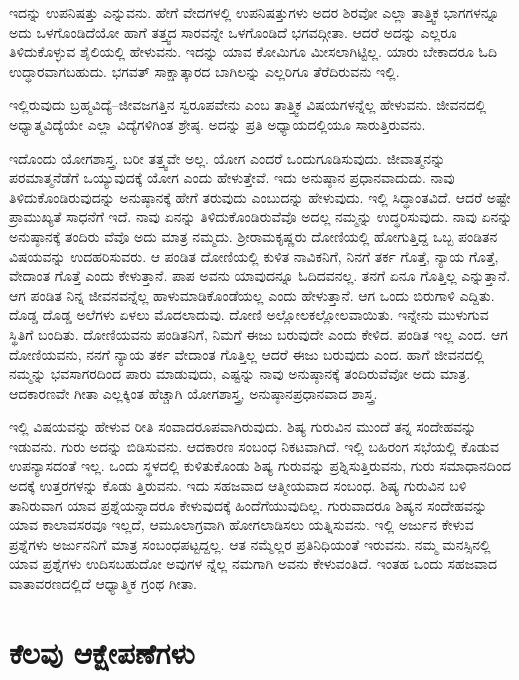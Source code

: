 ಇದನ್ನು ಉಪನಿಷತ್ತು ಎನ್ನುವನು. ಹೇಗೆ ವೇದಗಳಲ್ಲಿ ಉಪನಿಷತ್ತುಗಳು ಅದರ ಶಿರವೋ ಎಲ್ಲಾ ತಾತ್ತ್ವಿಕ ಭಾಗಗಳನ್ನೂ ಅದು ಒಳಗೊಂಡಿದೆಯೋ ಹಾಗೆ ತತ್ತ್ವದ ಸಾರವನ್ನೇ ಒಳಗೊಂಡಿದೆ ಭಗವದ್ಗೀತಾ. ಆದರೆ ಅದನ್ನು ಎಲ್ಲರೂ ತಿಳಿದುಕೊಳ್ಳುವ ಶೈಲಿಯಲ್ಲಿ ಹೇಳುವನು. ಇದನ್ನು ಯಾವ ಕೋಮಿಗೂ ಮೀಸಲಾಗಿಟ್ಟಿಲ್ಲ. ಯಾರು ಬೇಕಾದರೂ ಓದಿ ಉದ್ಧಾರವಾಗಬಹುದು. ಭಗವತ್ ಸಾಕ್ಷಾತ್ಕಾರದ ಬಾಗಿಲನ್ನು ಎಲ್ಲರಿಗೂ ತೆರೆದಿರುವನು ಇಲ್ಲಿ.

ಇಲ್ಲಿರುವುದು ಬ್ರಹ್ಮವಿದ್ಯೆ–ಜೀವಜಗತ್ತಿನ ಸ್ವರೂಪವೇನು ಎಂಬ ತಾತ್ತ್ವಿಕ ವಿಷಯಗಳನ್ನೆಲ್ಲ ಹೇಳುವನು. ಜೀವನದಲ್ಲಿ ಅಧ್ಯಾತ್ಮವಿದ್ಯೆಯೇ ಎಲ್ಲಾ ವಿದ್ಯೆಗಳಿಗಿಂತ ಶ್ರೇಷ್ಠ. ಅದನ್ನು ಪ್ರತಿ ಅಧ್ಯಾಯದಲ್ಲಿಯೂ ಸಾರುತ್ತಿರುವನು.

ಇದೊಂದು ಯೋಗಶಾಸ್ತ್ರ. ಬರೀ ತತ್ತ್ವವೇ ಅಲ್ಲ. ಯೋಗ ಎಂದರೆ ಒಂದುಗೂಡಿಸುವುದು. ಜೀವಾತ್ಮನನ್ನು ಪರಮಾತ್ಮನೆಡೆಗೆ ಒಯ್ಯುವುದಕ್ಕೆ ಯೋಗ ಎಂದು ಹೇಳುತ್ತೇವೆ. ಇದು ಅನುಷ್ಠಾನ ಪ್ರಧಾನವಾದುದು. ನಾವು ತಿಳಿದುಕೊಂಡಿರುವುದನ್ನು ಅನುಷ್ಠಾನಕ್ಕೆ ಹೇಗೆ ತರುವುದು ಎಂಬುದನ್ನು ಹೇಳುವುದು. ಇಲ್ಲಿ ಸಿದ್ಧಾಂತವಿದೆ. ಆದರೆ ಅಷ್ಟೇ ಪ್ರಾಮುಖ್ಯತೆ ಸಾಧನೆಗೆ ಇದೆ. ನಾವು ಏನನ್ನು ತಿಳಿದುಕೊಂಡಿರುವೆವೊ ಅದಲ್ಲ ನಮ್ಮನ್ನು ಉದ್ಧರಿಸುವುದು. ನಾವು ಏನನ್ನು ಅನುಷ್ಠಾನಕ್ಕೆ ತಂದಿರು ವೆವೊ ಅದು ಮಾತ್ರ ನಮ್ಮದು. ಶ‍್ರೀರಾಮಕೃಷ್ಣರು ದೋಣಿಯಲ್ಲಿ ಹೋಗುತ್ತಿದ್ದ ಒಬ್ಬ ಪಂಡಿತನ ವಿಷಯವನ್ನು ಉದಹರಿಸುವರು. ಆ ಪಂಡಿತ ದೋಣಿಯಲ್ಲಿ ಕುಳಿತ ನಾವಿಕನಿಗೆ, ನಿನಗೆ ತರ್ಕ ಗೊತ್ತೆ, ನ್ಯಾಯ ಗೊತ್ತೆ, ವೇದಾಂತ ಗೊತ್ತೆ ಎಂದು ಕೇಳುತ್ತಾನೆ. ಪಾಪ ಅವನು ಯಾವುದನ್ನೂ ಓದಿದವನಲ್ಲ. ತನಗೆ ಏನೂ ಗೊತ್ತಿಲ್ಲ ಎನ್ನುತ್ತಾನೆ. ಆಗ ಪಂಡಿತ ನಿನ್ನ ಜೀವನವನ್ನೆಲ್ಲ ಹಾಳುಮಾಡಿಕೊಂಡೆಯಲ್ಲ ಎಂದು ಹೇಳುತ್ತಾನೆ. ಆಗ ಒಂದು ಬಿರುಗಾಳಿ ಎದ್ದಿತು. ದೊಡ್ಡ ದೊಡ್ಡ ಅಲೆಗಳು ಏಳಲು ಮೊದಲಾದುವು. ದೋಣಿ ಅಲ್ಲೋಲಕಲ್ಲೋಲ\-ವಾಯಿತು. ಇನ್ನೇನು ಮುಳುಗುವ ಸ್ಥಿತಿಗೆ ಬಂದಿತು. ದೋಣಿಯವನು ಪಂಡಿತನಿಗೆ, ನಿಮಗೆ ಈಜು ಬರುವುದೇ ಎಂದು ಕೇಳಿದ. ಪಂಡಿತ ಇಲ್ಲ ಎಂದ. ಆಗ ದೋಣಿಯವನು, ನನಗೆ ನ್ಯಾಯ ತರ್ಕ ವೇದಾಂತ ಗೊತ್ತಿಲ್ಲ ಆದರೆ ಈಜು ಬರುವುದು ಎಂದ. ಹಾಗೆ ಜೀವನದಲ್ಲಿ ನಮ್ಮನ್ನು ಭವಸಾಗರದಿಂದ ಪಾರು ಮಾಡುವುದು, ಎಷ್ಟನ್ನು ನಾವು ಅನುಷ್ಠಾನಕ್ಕೆ ತಂದಿರುವೆವೋ ಅದು ಮಾತ್ರ. ಆದಕಾರಣವೇ ಗೀತಾ ಎಲ್ಲಕ್ಕಿಂತ ಹೆಚ್ಚಾಗಿ ಯೋಗಶಾಸ್ತ್ರ, ಅನುಷ್ಠಾನಪ್ರಧಾನವಾದ ಶಾಸ್ತ್ರ.

ಇಲ್ಲಿ ವಿಷಯವನ್ನು ಹೇಳುವ ರೀತಿ ಸಂವಾದರೂಪವಾಗಿರುವುದು. ಶಿಷ್ಯ ಗುರುವಿನ ಮುಂದೆ ತನ್ನ ಸಂದೇಹವನ್ನು ಇಡುವನು. ಗುರು ಅದನ್ನು ಬಿಡಿಸುವನು. ಆದಕಾರಣ ಸಂಬಂಧ ನಿಕಟವಾಗಿದೆ. ಇಲ್ಲಿ ಬಹಿರಂಗ ಸಭೆಯಲ್ಲಿ ಕೊಡುವ ಉಪನ್ಯಾಸದಂತೆ ಇಲ್ಲ. ಒಂದು ಸ್ಥಳದಲ್ಲಿ ಕುಳಿತುಕೊಂಡು ಶಿಷ್ಯ ಗುರುವನ್ನು ಪ್ರಶ್ನಿಸುತ್ತಿರುವನು, ಗುರು ಸಮಾಧಾನದಿಂದ ಅದಕ್ಕೆ ಉತ್ತರಗಳನ್ನು ಕೊಡು ತ್ತಿರುವನು. ಇದು ಸಹಜವಾದ ಆತ್ಮೀಯವಾದ ಸಂಬಂಧ. ಶಿಷ್ಯ ಗುರುವಿನ ಬಳಿ ತಾನಿರುವಾಗ ಯಾವ ಪ್ರಶ್ನೆಯನ್ನಾದರೂ ಕೇಳುವುದಕ್ಕೆ ಹಿಂದೆಗೆಯುವುದಿಲ್ಲ. ಗುರುವಾದರೂ ಶಿಷ್ಯನ ಸಂದೇಹವನ್ನು ಯಾವ ಕಾಲಾವಸರವೂ ಇಲ್ಲದೆ, ಆಮೂಲಾಗ್ರವಾಗಿ ಹೋಗಲಾಡಿಸಲು ಯತ್ನಿಸುವನು. ಇಲ್ಲಿ ಅರ್ಜುನ ಕೇಳುವ ಪ್ರಶ್ನೆಗಳು ಅರ್ಜುನನಿಗೆ ಮಾತ್ರ ಸಂಬಂಧಪಟ್ಟದ್ದಲ್ಲ. ಆತ ನಮ್ಮೆಲ್ಲರ ಪ್ರತಿನಿಧಿಯಂತೆ ಇರುವನು. ನಮ್ಮ ಮನಸ್ಸಿನಲ್ಲಿ ಯಾವ ಪ್ರಶ್ನೆಗಳು ಉದಿಸಬಹುದೋ ಅವುಗಳ ನ್ನೆಲ್ಲ ನಮಗಾಗಿ ಅವನು ಕೇಳುವಂತಿದೆ. ಇಂತಹ ಒಂದು ಸಹಜವಾದ ವಾತಾವರಣದಲ್ಲಿದೆ ಆಧ್ಯಾತ್ಮಿಕ ಗ್ರಂಥ ಗೀತಾ.


\section*{ಕೆಲವು ಆಕ್ಷೇಪಣೆಗಳು}

